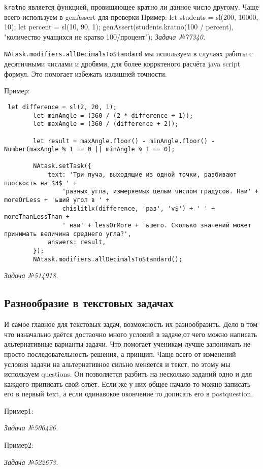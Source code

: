 \texttt{kratno} является функцией, провищяющее кратно ли данное число другому. Чаще всего используем в genAssert для проверки
Пример:
let students = sl(200, 10000, 10);
let percent = sl(10, 90, 1);
genAssert(students.kratno(100 / percent), "количество учащихся не кратко 100/процент");
\textsl{Задача №77340.}

\texttt{NAtask.modifiers.allDecimalsToStandard} мы используем в случаях работы с десятичными числами и дробями, для более коррктеного расчёта java script формул.
 Это помогает избежать излишней точности.

Пример:
\begin{lstlisting}
 let difference = sl(2, 20, 1);
        let minAngle = (360 / (2 * difference + 1));
        let maxAngle = (360 / (difference + 2));

        let result = maxAngle.floor() - minAngle.floor() - Number(maxAngle % 1 == 0 || minAngle % 1 == 0);

        NAtask.setTask({
            text: 'Три луча, выходящие из одной точки, разбивают плоскость на $3$ ' +
                'разных угла, измеряемых целым числом градусов. Наи' + moreOrLess + 'ьший угол в ' +
                chislitlx(difference, 'раз', 'v$') + ' ' + moreThanLessThan +
                ' наи' + lessOrMore + 'ьшего. Сколько значений может принимать величина среднего угла?',
            answers: result,
        });
        NAtask.modifiers.allDecimalsToStandard();
\end{lstlisting}       
\textsl{Задача №514918.}



\subsection{Разнообразие в текстовых задачах}
И самое главное для текстовых задач, возможность их разнообразить. Дело в том что изначально даётся достаочно много условий в задаче,от чего можно написать альтернативные варианты задачи. Что помогает ученикам лучше запонимать не просто последовательность решения, а принцип.
Чаще всего от изменений условия задачи на альтернативное сильно меняется и текст, по этому мы используем questions. Он позволяется разбить на несколько заданий одно и для каждого приписать свой ответ. Если же у них общее начало то можно записать его в первый text, а если одинавокое окончение то 
дописать его в postquestion.

Пример1: 
 
\textsl{Задача №506426.}

Пример2:
 
\textsl{Задача №522673.}